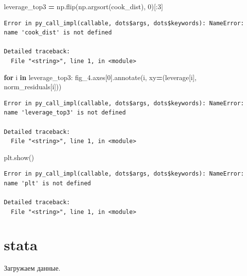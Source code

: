 \documentclass[]{book}
\newenvironment{Shaded}{\begin{snugshade}}{\end{snugshade}}
\newcommand{\ControlFlowTok}[1]{\textcolor[rgb]{0.13,0.29,0.53}{\textbf{#1}}}
\newcommand{\DecValTok}[1]{\textcolor[rgb]{0.00,0.00,0.81}{#1}}
\newcommand{\KeywordTok}[1]{\textcolor[rgb]{0.13,0.29,0.53}{\textbf{#1}}}
\newcommand{\NormalTok}[1]{#1}
\newcommand{\OperatorTok}[1]{\textcolor[rgb]{0.81,0.36,0.00}{\textbf{#1}}}
\begin{document}
\begin{Shaded}
\begin{Highlighting}[]
\NormalTok{leverage_top3 }\OperatorTok{=}\NormalTok{ np.flip(np.argsort(cook_dist), }\DecValTok{0}\NormalTok{)[:}\DecValTok{3}\NormalTok{]}
\end{Highlighting}
\end{Shaded}

\begin{verbatim}
Error in py_call_impl(callable, dots$args, dots$keywords): NameError: name 'cook_dist' is not defined

Detailed traceback: 
  File "<string>", line 1, in <module>
\end{verbatim}

\begin{Shaded}
\begin{Highlighting}[]
\ControlFlowTok{for}\NormalTok{ i }\KeywordTok{in}\NormalTok{ leverage_top3:}
\NormalTok{    fig_4.axes[}\DecValTok{0}\NormalTok{].annotate(i, }
\NormalTok{                               xy}\OperatorTok{=}\NormalTok{(leverage[i], }
\NormalTok{                                   norm_residuals[i]))}
\end{Highlighting}
\end{Shaded}

\begin{verbatim}
Error in py_call_impl(callable, dots$args, dots$keywords): NameError: name 'leverage_top3' is not defined

Detailed traceback: 
  File "<string>", line 1, in <module>
\end{verbatim}

\begin{Shaded}
\begin{Highlighting}[]
\NormalTok{plt.show()}
\end{Highlighting}
\end{Shaded}

\begin{verbatim}
Error in py_call_impl(callable, dots$args, dots$keywords): NameError: name 'plt' is not defined

Detailed traceback: 
  File "<string>", line 1, in <module>
\end{verbatim}

\hypertarget{stata}{%
\section{stata}\label{stata}}

Загружаем данные.
\end{document}
